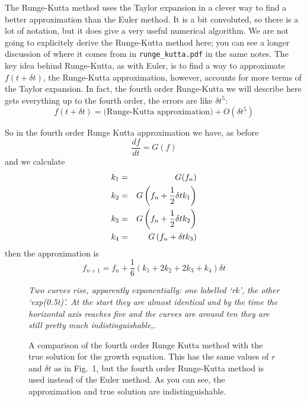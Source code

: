 \documentclass[12pt]{article}
\begin{document}
The Runge-Kutta method uses the Taylor expansion in a clever way to
find a better approximation than the Euler method. It is a bit
convoluted, so there is a lot of notation, but it does give a very
useful numerical algorithm. We are not going to explicitely derive the
Runge-Kutta method here; you can see a longer discussion of where it
comes from in \texttt{runge\_kutta.pdf} in the same notes. The key
idea behind Runge-Kutta, as with Euler, is to find a way to
approximate $f(t+\delta t)$, the Runge-Kutta approximation, however,
accounts for more terms of the Taylor expansion. In fact, the fourth
order Runge-Kutta we will describe here gets everything up to the
fourth order, the errors are like $\delta t^5$:
\begin{equation}
  f(t+\delta t)=\mbox{(Runge-Kutta approximation)}+O(\delta t^5)
\end{equation}

So in the fourth order Runge Kutta approximation we have, as before
\begin{equation}
\frac{df}{dt}=G(f)
\end{equation}
and we calculate
\begin{eqnarray}
k_1&=&G(f_n)\cr
k_2&=&G\left(f_n+\frac{1}{2}\delta tk_1\right)\cr 
k_3&=&G\left(f_n+\frac{1}{2}\delta tk_2\right)\cr 
k_4&=&G\left(f_n+\delta tk_3\right) 
\end{eqnarray}
then the approximation is
\begin{equation}
f_{n+1}=f_n+\frac{1}{6}(k_1+2k_2+2k_3+k_4)\delta t
\end{equation}

\begin{figure}
{\textsl{Two curves rise, apparently exponentially: one labelled `rk', the other `exp(0.5t)'. At the start they are almost identical and by the time the horizontal axis reaches five and the curves are around ten they are still pretty much indistinguishable,.}}
{  \begin{center}

  \end{center}
  }
\caption{A comparison of the fourth order Runge Kutta method with the
  true solution for the growth equation. This has the same values of
  $r$ and $\delta t$ as in Fig.~1, but the fourth order Runge-Kutta
  method is used instead of the Euler method. As you can see, the
  approximation and true solution are indistinguishable.}
\end{figure}
\end{document}
